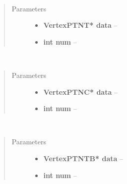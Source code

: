 \documentclass[letterpaper,10pt,english]{sphinxmanual}
\begin{document}

\begin{fulllineitems}
\label{gl:VBO::setVertexData__VertexPTNTP.i}~\begin{quote}\begin{description}
\item[{Parameters}] \leavevmode\begin{itemize}
\item {} 
\textbf{VertexPTNT* data} -- 

\item {} 
\textbf{int num} -- 

\end{itemize}

\end{description}\end{quote}

\end{fulllineitems}


\begin{fulllineitems}
\label{gl:VBO::setVertexData__VertexPTNCP.i}~\begin{quote}\begin{description}
\item[{Parameters}] \leavevmode\begin{itemize}
\item {} 
\textbf{VertexPTNC* data} -- 

\item {} 
\textbf{int num} -- 

\end{itemize}

\end{description}\end{quote}

\end{fulllineitems}


\begin{fulllineitems}
\label{gl:VBO::setVertexData__VertexPTNTBP.i}~\begin{quote}\begin{description}
\item[{Parameters}] \leavevmode\begin{itemize}
\item {} 
\textbf{VertexPTNTB* data} -- 

\item {} 
\textbf{int num} -- 

\end{itemize}

\end{description}\end{quote}

\end{fulllineitems}
\end{document}
